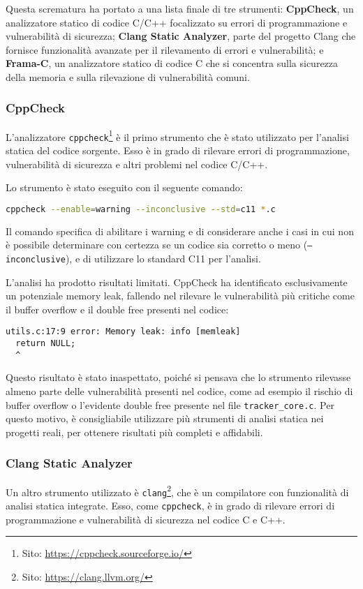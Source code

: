 Questa scrematura ha portato a una lista finale di tre strumenti: \textbf{CppCheck},
un analizzatore statico di codice C/C++ focalizzato su errori di programmazione
e vulnerabilità di sicurezza; \textbf{Clang Static Analyzer}, parte del progetto
Clang che fornisce funzionalità avanzate per il rilevamento di errori e vulnerabilità;
e \textbf{Frama-C}, un analizzatore statico di codice C che si concentra sulla
sicurezza della memoria e sulla rilevazione di vulnerabilità comuni.

\subsubsection*{CppCheck}
L'analizzatore \texttt{cppcheck}\footnote{Sito: \url{https://cppcheck.sourceforge.io/}}
è il primo strumento che è stato utilizzato per l'analisi statica del codice
sorgente. Esso è in grado di rilevare errori di programmazione, vulnerabilità di
sicurezza e altri problemi nel codice C/C++.

Lo strumento è stato eseguito con il seguente comando: \begin{lstlisting}[language=bash, numbers=none]
cppcheck --enable=warning --inconclusive --std=c11 *.c
\end{lstlisting}
Il comando specifica di abilitare i warning e di considerare anche i casi in cui
non è possibile determinare con certezza se un codice sia corretto o meno (\texttt{--inconclusive}),
e di utilizzare lo standard C11 per l'analisi.

L'analisi ha prodotto risultati limitati. CppCheck ha identificato
esclusivamente un potenziale memory leak, fallendo nel rilevare le vulnerabilità
più critiche come il buffer overflow e il double free presenti nel codice:

\begin{lstlisting}[language={}, numbers=none]
utils.c:17:9 error: Memory leak: info [memleak]
  return NULL;
  ^
\end{lstlisting}

Questo risultato è stato inaspettato, poiché si pensava che lo strumento rilevasse
almeno parte delle vulnerabilità presenti nel codice, come ad esempio il rischio
di buffer overflow o l'evidente double free presente nel file \texttt{tracker\_core.c}.
Per questo motivo, è consigliabile utilizzare più strumenti di analisi statica nei
progetti reali, per ottenere risultati più completi e affidabili.

\subsubsection*{Clang Static Analyzer}
Un altro strumento utilizzato è \texttt{clang}\footnote{Sito: \url{https://clang.llvm.org/}},
che è un compilatore con funzionalità di analisi statica integrate. Esso, come \texttt{cppcheck},
è in grado di rilevare errori di programmazione e vulnerabilità di sicurezza nel
codice C e C++.

